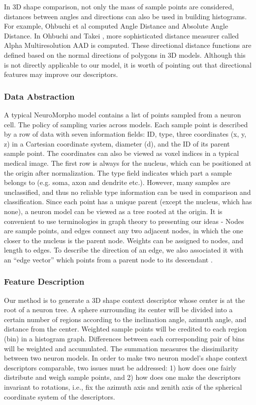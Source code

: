 \documentclass[letterpaper,11pt,oneside]{article}
\begin{document}
In 3D shape comparison, not only the mass of sample points are considered, distances between angles and directions can also be used in building histograms. For example, Ohbuchi et al \cite{Ohbuchi03a} computed Angle Distance and Absolute Angle Distance. In Ohbuchi and Takei \cite{Ohbuchi03}, more sophisticated distance measurer called Alpha Multiresolution AAD is computed. These directional distance functions are defined based on the normal directions of polygons in 3D models. Although this is not directly applicable to our model, it is worth of pointing out that directional features may improve our descriptors.

\subsubsection{Data Abstraction}
A typical NeuroMorpho model contains a list of points sampled from a neuron cell. The policy of sampling varies across models. Each sample point is described by a row of data with seven information fields: ID, type, three coordinates (x, y, z) in a Cartesian coordinate system, diameter (d), and the ID of its parent sample point. The coordinates can also be viewed as voxel indices in a typical medical image. The first row is always for the nucleus, which can be positioned at the origin after normalization. The type field indicates which part a sample belongs to (e.g. soma, axon and dendrite etc.). However, many samples are unclassified, and thus no reliable type information can be used in comparison and classification. Since each point has a unique parent (except the nucleus, which has none), a neuron model can be viewed as a tree rooted at the origin. It is convenient to use terminologies in graph theory to presenting our ideas - Nodes are sample points, and edges connect any two adjacent nodes, in which the one closer to the nucleus is the parent node. Weights can be assigned to nodes, and length to edges. To describe the direction of an edge, we also associated it with an ``edge vector'' which points from a parent node to its descendant .

\subsubsection{Feature Description}
Our method is to generate a 3D shape context descriptor whose center is at the root of a neuron tree. A sphere surrounding its center will be divided into a certain number of regions according to the inclination angle, azimuth angle, and distance from the center. Weighted sample points will be credited to each region (bin) in a histogram graph. Differences between each corresponding pair of bins will be weighted and accumulated. The summation measures the dissimilarity between two neuron models. In order to make two neuron model's shape context descriptors comparable, two issues must be addressed: 1) how does one fairly distribute and weigh sample points, and 2) how does one make the descriptors invariant to rotations, i.e., fix the azimuth axis and zenith axis of the spherical coordinate system of the descriptors. 
\end{document}
